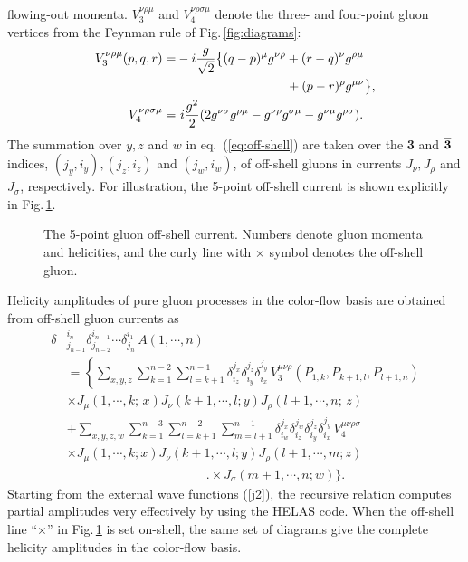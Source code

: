  flowing-out momenta.
$V_3^{\nu\rho\mu}$ and $V_4^{\nu\rho\sigma\mu}$ denote the three- and
 four-point gluon vertices from the Feynman rule of Fig.\,\ref{fig:diagrams}:
\begin{align}
V_3^{\nu\rho\mu}(p,q,r)=&-i\frac{g}{\sqrt{2}}\bigl\{(q-p)^{\mu}g^{\nu\rho}+(r-q)^{\nu}g^{\rho\mu}\nonumber\\
&\hspace{8.7em}+(p-r)^{\rho}g^{\mu\nu}\bigr\},\\
V_4^{\nu\rho\sigma\mu}=&\,\,i\frac{g^2}{2}(2g^{\nu\sigma}g^{\rho\mu}-g^{\nu\rho}g^{\sigma\mu}-g^{\nu\mu}g^{\rho\sigma}).
\end{align}
The summation over $y,z$ and $w$ in eq.~(\ref{eq:off-shell}) are taken over the {\bf 3} and $\overline{{\bf 3}}$ indices, $(j_y, i_y), (j_z, i_z)$
 and $(j_w, i_w)$, of off-shell gluons in currents $J_{\nu}, J_{\rho}$ and $J_{\sigma}$, respectively.
 For
illustration, the 5-point off-shell current is shown explicitly in
Fig.\,\ref{fig:5offshell}.
\begin{figure}[b]
\caption{The 5-point gluon off-shell current. Numbers denote gluon momenta
 and helicities, and the curly line with $\times$ symbol denotes the off-shell
 gluon.}
\label{fig:5offshell}
\end{figure}

Helicity amplitudes of pure gluon processes in the color-flow basis are obtained from off-shell
gluon currents as
\begin{align}
\delta&_{j_{n-1}}^{i_n}\delta_{j_{n-2}}^{i_{n-1}}\cdots\delta_{j_n}^{i_1}\,A(1,\cdots,n)\nonumber\\
&=\left\{\sum_{x,y,z}\sum_{k=1}^{n-2}\sum_{l=k+1}^{n-1}
\delta_{i_z}^{j_x}\delta_{i_y}^{j_z}\delta_{i_x}^{j_y}\,V^{\mu\nu\rho}_3(P_{1,k}, P_{k+1,l},P_{l+1,n})\right.\nonumber\\
&\times J_{\mu}(1,\cdots,k;\,x)J_{\nu}(k+1,\cdots,l; y) J_{\rho}(l+1,\cdots,n;\,z)\nonumber\\
&+\sum_{x,y,z,w}\sum_{k=1}^{n-3}\sum_{l=k+1}^{n-2}\sum_{m=l+1}^{n-1}
\delta_{i_w}^{j_x}\delta_{i_z}^{j_w}\delta_{i_y}^{j_z}\delta_{i_x}^{j_y}\,
V^{\mu\nu\rho\sigma}_4\nonumber\\
& \times J_{\mu}(1,\cdots,k;x) J_{\nu}(k+1,\cdots,l;y) J_{\rho}(l+1,\cdots,m;z) \nonumber\\
&\hspace{11em}\Biggl. \times J_{\sigma}(m+1,\cdots,n;w)\Biggr\}.
\label{eq:amplitude}
\end{align}
Starting from the external wave functions (\ref{j2}), the recursive
relation computes partial amplitudes very effectively by using the
HELAS code. When the off-shell line ``$\times$'' in Fig.\,\ref{fig:5offshell} is set
on-shell, the same set of diagrams give the complete helicity amplitudes
in the color-flow basis.

